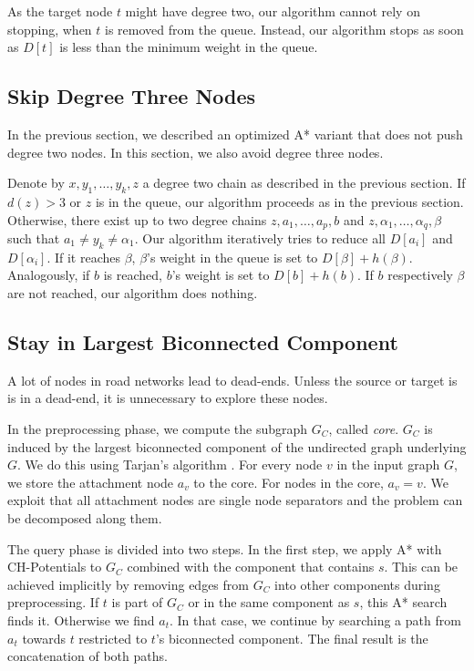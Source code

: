 \documentclass[letterpaper]{article} %
\begin{document}
As the target node $t$ might have degree two, our algorithm cannot rely on stopping, when $t$ is removed from the queue.
Instead, our algorithm stops as soon as $D[t]$ is less than the minimum weight in the queue.

\subsection{Skip Degree Three Nodes}

In the previous section, we described an optimized A* variant that does not push degree two nodes.
In this section, we also avoid degree three nodes.

Denote by $x,y_1,\ldots, y_k, z$ a degree two chain as described in the previous section.
If $d(z) > 3$ or $z$ is in the queue, our algorithm proceeds as in the previous section.
Otherwise, there exist up to two degree chains $z,a_1,\ldots,a_p,b$ and $z,\alpha_1,\ldots,\alpha_q,\beta$ such that $a_1\neq y_k \neq \alpha_1$.
Our algorithm iteratively tries to reduce all $D[a_i]$ and $D[\alpha_i]$.
If it reaches $\beta$, $\beta$'s weight in the queue is set to $D[\beta]+h(\beta)$.
Analogously, if $b$ is reached, $b$'s weight is set to $D[b]+h(b)$.
If $b$ respectively $\beta$ are not reached, our algorithm does nothing.

\subsection{Stay in Largest Biconnected Component}

\label{sec:largested-biconnected-component}

A lot of nodes in road networks lead to dead-ends.
Unless the source or target is is in a dead-end, it is unnecessary to explore these nodes.

In the preprocessing phase, we compute the subgraph $G_C$, called \emph{core}.
$G_C$ is induced by the largest biconnected component of the undirected graph underlying $G$.
We do this using Tarjan's algorithm \cite{t-dfslg2-72}.
For every node $v$ in the input graph $G$, we store the attachment node $a_v$ to the core.
For nodes in the core, $a_v=v$.
We exploit that all attachment nodes are single node separators and the problem can be decomposed along them.

The query phase is divided into two steps.
In the first step, we apply A* with CH-Potentials to $G_C$ combined with the component that contains $s$.
This can be achieved implicitly by removing edges from $G_C$ into other components during preprocessing.
If $t$ is part of $G_C$ or in the same component as $s$, this A* search finds it.
Otherwise we find $a_t$.
In that case, we continue by searching a path from $a_t$ towards $t$ restricted to $t$'s biconnected component.
The final result is the concatenation of both paths.
\end{document}

